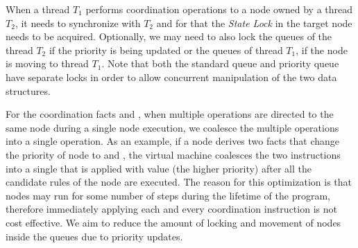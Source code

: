 When a thread $T_1$ performs coordination operations to a node owned by a thread
$T_2$, it needs to synchronize with $T_2$ and for that the \emph{State Lock} in
the target node needs to be acquired. Optionally, we may need to also lock the
queues of the thread $T_2$ if the priority is being updated or the queues of
thread $T_1$, if the node is moving to thread $T_1$. Note that both the standard
queue and priority queue have separate locks in order to allow concurrent
manipulation of the two data structures.

For the coordination facts  and , when
multiple operations are directed to the same node during a single node
execution, we coalesce the multiple operations into a single operation.  As an
example, if a node derives two  facts that change the
priority of node  to  and , the virtual machine
coalesces the two instructions into a single  that is applied
with value  (the higher priority) after all the candidate rules of the
node are executed. The reason for this optimization is that nodes may run for
some number of steps during the lifetime of the program, therefore immediately
applying each and every coordination instruction is not cost effective. We aim
to reduce the amount of locking and movement of nodes inside the queues due to
priority updates.
